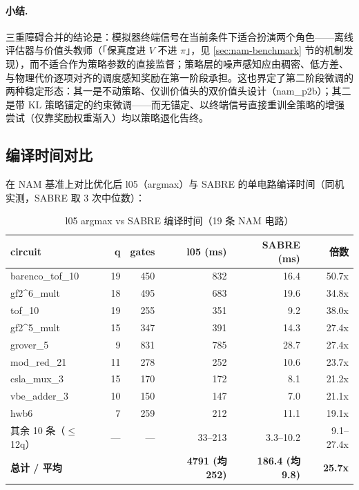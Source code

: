 \paragraph{小结.} 三重障碍合并的结论是：模拟器终端信号在当前条件下适合扮演两个角色——离线评估器与价值头教师（「保真度进 $V$ 不进 $\pi$」，见 \ref{sec:nam-benchmark} 节的机制发现），而不适合作为策略参数的直接监督；策略层的噪声感知应由稠密、低方差、与物理代价逐项对齐的调度感知奖励在第一阶段承担。这也界定了第二阶段微调的两种稳定形态：其一是不动策略、仅训价值头的双价值头设计（nam\_p2b）；其二是带 KL 策略锚定的约束微调——而无锚定、以终端信号直接重训全策略的增强尝试（仅靠奖励权重渐入）均以策略退化告终。

\subsection{编译时间对比}
\label{sec:compile-time}

在 NAM 基准上对比优化后 l05（argmax）与 SABRE 的单电路编译时间（同机实测，SABRE 取 3 次中位数）：

\begin{table}[htbp]
\centering
\caption{l05 argmax vs SABRE 编译时间（19 条 NAM 电路）}
\label{tab:compile-time}
\small
\begin{tabular}{l|rr|rrr}
\hline
circuit & q & gates & l05 (ms) & SABRE (ms) & 倍数 \\
\hline
barenco\_tof\_10 & 19 & 450 & 832 & 16.4 & 50.7x \\
gf2\textasciicircum 6\_mult & 18 & 495 & 683 & 19.6 & 34.8x \\
tof\_10 & 19 & 255 & 351 & 9.2 & 38.0x \\
gf2\textasciicircum 5\_mult & 15 & 347 & 391 & 14.3 & 27.4x \\
grover\_5 & 9 & 831 & 785 & 28.7 & 27.4x \\
mod\_red\_21 & 11 & 278 & 252 & 10.6 & 23.7x \\
csla\_mux\_3 & 15 & 170 & 172 & 8.1 & 21.2x \\
vbe\_adder\_3 & 10 & 150 & 147 & 7.0 & 21.1x \\
hwb6 & 7 & 259 & 212 & 11.1 & 19.1x \\
其余 10 条（$\leq$12q） & --- & --- & 33--213 & 3.3--10.2 & 9.1--27.4x \\
\hline
\textbf{总计 / 平均} & & & \textbf{4791 (均 252)} & \textbf{186.4 (均 9.8)} & \textbf{25.7x} \\
\hline
\end{tabular}
\end{table}

